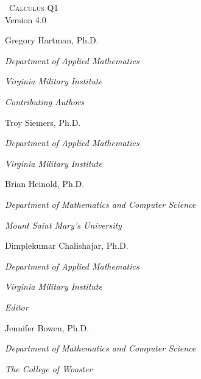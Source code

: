 
\hskip 125pt\begin{minipage}{\textwidth}
\begin{flushright}
\thispagestyle{empty}


\textsc{\large \apex\ {\Huge Calculus Q1}} \\

{\small Version 4.0}\\

\Large
\vspace{1in}

Gregory Hartman, Ph.D.

\emph{\small Department of Applied Mathematics}

\emph{\small Virginia Military Institute}\vskip15pt

\parbox{200pt}{\textit{Contributing Authors}}\hskip 2cm \phantom{.}

%
%

Troy Siemers, Ph.D. 

\emph{\small Department of Applied Mathematics}

\emph{\small Virginia Military Institute}\vskip 15pt

Brian Heinold, Ph.D.

\emph{\small Department of Mathematics and Computer Science}

\emph{\small Mount Saint Mary's University}\vskip 15pt

Dimplekumar Chalishajar, Ph.D.

\emph{\small Department of Applied Mathematics}

\emph{\small Virginia Military Institute}\vskip 25pt

\parbox{200pt}{\textit{Editor}}\hskip 2cm \phantom{.}

Jennifer Bowen, Ph.D.

\emph{\small Department of Mathematics and Computer Science}

\emph{\small The College of Wooster}

\normalsize
\end{flushright}
\end{minipage}


